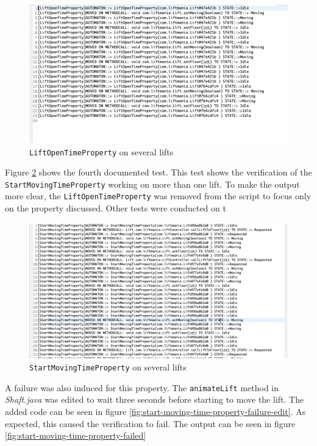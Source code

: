 \documentclass[a4paper, 12pt]{article}
\begin{document}
\begin{figure}[h]
   \centering
   \includegraphics[width=\textwidth,height=\textheight,keepaspectratio]{images/lift-open-test-multiple} %
   \caption{\texttt{LiftOpenTimeProperty} on several lifts}
   \label{fig:lift-open-test-multiple}
\end{figure}

Figure \ref{fig:start-moving-time-property-several} shows the fourth documented test. This test shows the verification of the \texttt{StartMovingTimeProperty} working on more than one lift. To make the output more clear, the \texttt{LiftOpenTimeProperty} was removed from the script to focus only on the property  discussed. Other tests were conducted on t

\begin{figure}[h]
   \centering
   \includegraphics[width=\textwidth,height=\textheight,keepaspectratio]{images/start-moving-time-property-several} %
   \caption{\texttt{StartMovingTimeProperty} on several lifts}
   \label{fig:start-moving-time-property-several}
\end{figure}

A failure was also induced for this property. The \texttt{animateLift} method in \textit{Shaft.java} was edited to wait three seconds before starting to move the lift. The added code can be seen in figure \ref{fig:start-moving-time-property-failure-edit}. As expected, this caused the verification to fail. The output can be seen in figure \ref{fig:start-moving-time-property-failed}
\end{document}

